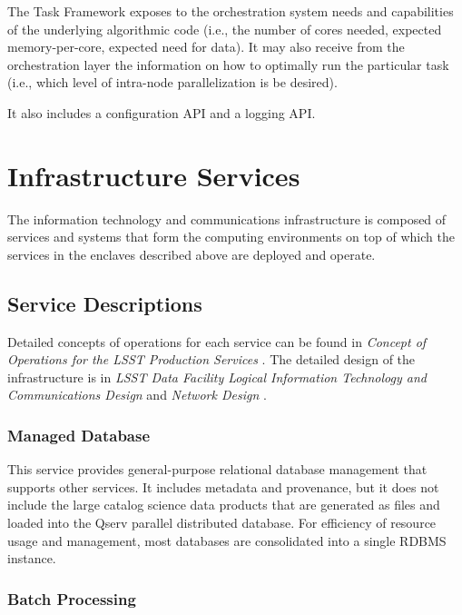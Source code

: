 \documentclass[DM,toc]{lsstdoc}
\begin{document}
The Task Framework exposes to the orchestration system needs and
capabilities of the underlying algorithmic code (i.e., the number of
cores needed, expected memory-per-core, expected need for data). It may
also receive from the orchestration layer the information on how to
optimally run the particular task (i.e., which level of intra-node
parallelization is be desired).

It also includes a configuration API and a logging API.


\section{Infrastructure Services}\label{infrastructure-services}

The information technology and communications infrastructure is composed of services and systems that form the computing environments on top of which the services in the enclaves described above are deployed and operate.

\subsection{Service Descriptions}\label{infrastructure-service-descriptions}

Detailed concepts of operations for each service can be found in \textit{Concept of Operations for the LSST Production Services} .
The detailed design of the infrastructure is in \textit{LSST Data Facility Logical Information Technology and Communications Design}  and \textit{Network Design} .

\subsubsection{Managed Database}\label{managed-database}

This service provides general-purpose relational database management that supports other services.
It includes metadata and provenance, but it does not include the large catalog science data products that are generated as files and loaded into the Qserv parallel distributed database.
For efficiency of resource usage and management, most databases are consolidated into a single RDBMS instance.

\subsubsection{Batch Processing}\label{batch-processing}
\end{document}
